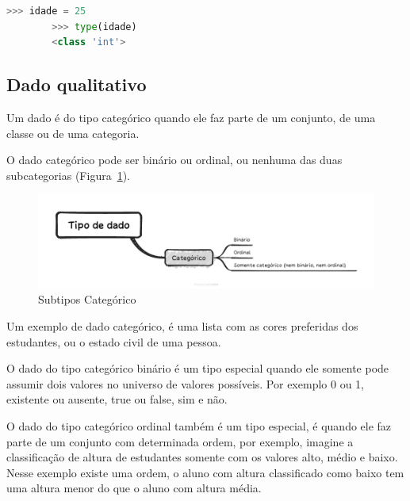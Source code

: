 \documentclass[a4paper,12pt]{book}
\begin{document}
	\begin{lstlisting}[language=Python, caption={Exemplo de declaração de variável do tipo inteiro, equivalente ao tipo de dado numérico contínuo.}]
		>>> idade = 25
		>>> type(idade)
		<class 'int'>
	\end{lstlisting}

	\subsection{Dado qualitativo}

	Um dado é do tipo categórico quando ele faz parte de um conjunto, de uma classe ou de uma categoria.

	O dado categórico pode ser binário ou ordinal, ou nenhuma das duas subcategorias (Figura~\ref{fig:categoricossubtipos}).

	\begin{figure}
		\centering
		\includegraphics[width=1\linewidth]{figuras/tipo_do_dado_categorico.png}
		\caption{Subtipos Categórico}
		\label{fig:categoricossubtipos}
	\end{figure}

	Um exemplo de dado categórico, é uma lista com as cores preferidas dos estudantes, ou o estado civil de uma pessoa.

	O dado do tipo categórico binário é um tipo especial quando ele somente pode assumir dois valores no universo de valores possíveis. Por exemplo 0 ou 1, existente ou ausente, true ou false, sim e não.

	O dado do tipo categórico ordinal também é um tipo especial, é quando ele faz parte de um conjunto com determinada ordem, por exemplo, imagine a classificação de altura de estudantes somente com os valores alto, médio e baixo. Nesse exemplo existe uma ordem, o aluno com altura classificado como baixo tem uma altura menor do que o aluno com altura média.




\end{document}
